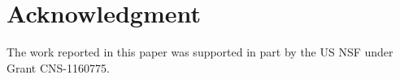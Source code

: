 \documentclass[10pt,journal,cspaper,compsoc]{IEEEtran}
\begin{document}
\maketitle


\IEEEdisplaynotcompsoctitleabstractindextext


%
\IEEEpeerreviewmaketitle






%


%
\section*{Acknowledgment}

The work reported in this paper was supported in part by the US NSF
under Grant CNS-1160775.
\end{document}
